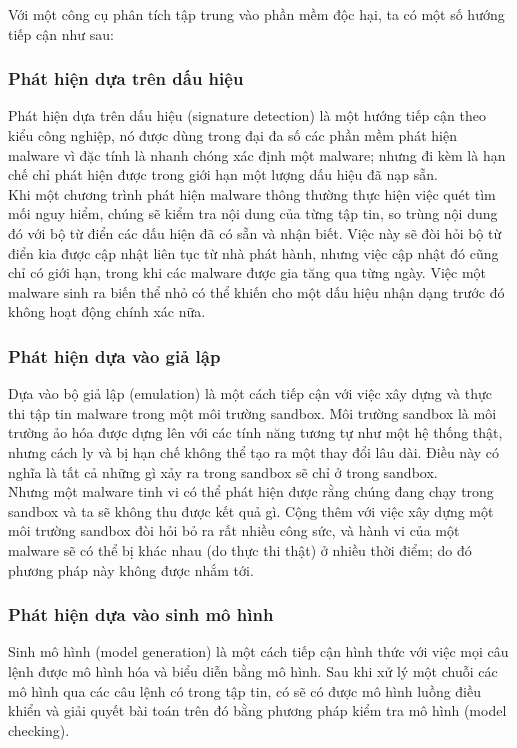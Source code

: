 Với một công cụ phân tích tập trung vào phần mềm độc hại, ta có một số hướng tiếp cận như sau:
		\subsubsection{Phát hiện dựa trên dấu hiệu}
Phát hiện dựa trên dấu hiệu (signature detection) là một hướng tiếp cận theo kiểu công nghiệp, nó được dùng trong đại đa số các phần mềm phát hiện malware vì đặc tính là nhanh chóng xác định một malware; nhưng đi kèm là hạn chế chỉ phát hiện được trong giới hạn một lượng dấu hiệu đã nạp sẵn.\\

Khi một chương trình phát hiện malware thông thường thực hiện việc quét tìm mối nguy hiểm, chúng sẽ kiểm tra nội dung của từng tập tin, so trùng nội dung đó với bộ từ điển các dấu hiện đã có sẵn và nhận biết. Việc này sẽ đòi hỏi bộ từ điển kia được cập nhật liên tục từ nhà phát hành, nhưng việc cập nhật đó cũng chỉ có giới hạn, trong khi các malware được gia tăng qua từng ngày. Việc một malware sinh ra biến thể nhỏ có thể khiến cho một dấu hiệu nhận dạng trước đó không hoạt động chính xác nữa.

		\subsubsection{Phát hiện dựa vào giả lập}
Dựa vào bộ giả lập (emulation) là một cách tiếp cận với việc xây dựng và thực thi tập tin malware trong một môi trường sandbox. Môi trường sandbox là môi trường ảo hóa được dựng lên với các tính năng tương tự như một hệ thống thật, nhưng cách ly và bị hạn chế không thể tạo ra một thay đổi lâu dài. Điều này có nghĩa là tất cả những gì xảy ra trong sandbox sẽ chỉ ở trong sandbox.\\

Nhưng một malware tinh vi có thể phát hiện được rằng chúng đang chạy trong sandbox và ta sẽ không thu được kết quả gì. Cộng thêm với việc xây dựng một môi trường sandbox đòi hỏi bỏ ra rất nhiều công sức, và hành vi của một malware sẽ có thể bị khác nhau (do thực thi thật) ở nhiều thời điểm; do đó phương pháp này không được nhắm tới.

		\subsubsection{Phát hiện dựa vào sinh mô hình}

Sinh mô hình (model generation) là một cách tiếp cận hình thức với việc mọi câu lệnh được mô hình hóa và biểu diễn bằng mô hình. Sau khi xử lý một chuỗi các mô hình qua các câu lệnh có trong tập tin, có sẽ có được mô hình luồng điều khiển và giải quyết bài toán trên đó bằng phương pháp kiểm tra mô hình (model checking).


